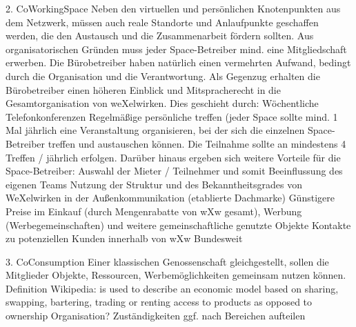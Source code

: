 2. CoWorkingSpace
Neben den virtuellen und persönlichen Knotenpunkten aus dem Netzwerk, müssen auch reale Standorte und Anlaufpunkte geschaffen werden, die den Austausch und die Zusammenarbeit fördern sollten.
Aus organisatorischen Gründen muss jeder Space-Betreiber mind. eine Mitgliedschaft erwerben.
Die Bürobetreiber haben natürlich einen vermehrten Aufwand, bedingt durch die Organisation und die Verantwortung. Als Gegenzug erhalten die Bürobetreiber einen höheren Einblick und Mitspracherecht in die Gesamtorganisation von weXelwirken.
Dies geschieht durch:
Wöchentliche Telefonkonferenzen
Regelmäßige persönliche treffen (jeder Space sollte mind. 1 Mal jährlich eine Veranstaltung organisieren, bei der sich die einzelnen Space-Betreiber treffen und austauschen können. Die Teilnahme sollte an mindestens 4 Treffen / jährlich erfolgen.
Darüber hinaus ergeben sich weitere Vorteile für die Space-Betreiber: 
Auswahl der Mieter / Teilnehmer und somit Beeinflussung des eigenen Teams
Nutzung der Struktur und des Bekanntheitsgrades von WeXelwirken in der Außenkommunikation (etablierte Dachmarke)
Günstigere Preise im Einkauf (durch Mengenrabatte von wXw gesamt), Werbung (Werbegemeinschaften) und weitere gemeinschaftliche genutzte Objekte
Kontakte zu potenziellen Kunden innerhalb von wXw Bundesweit



3. CoConsumption
Einer klassischen Genossenschaft gleichgestellt, sollen die Mitglieder Objekte, Ressourcen, Werbemöglichkeiten gemeinsam nutzen können.
Definition Wikipedia:
is used to describe an economic model based on sharing, swapping, bartering, trading or renting access to products as opposed to ownership
Organisation?
Zuständigkeiten ggf. nach Bereichen aufteilen

